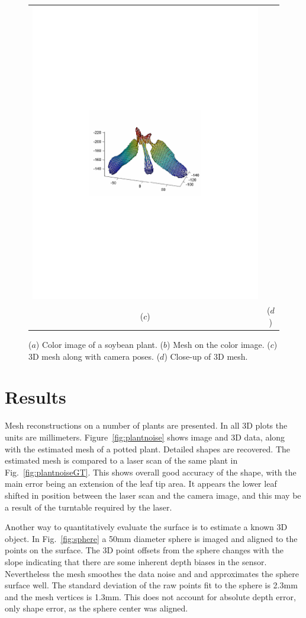 \begin{figure}
\begin{center}
\begin{tabular}{cc}
\includegraphics[trim=190 280 190 290,clip,width=0.48\linewidth]{Figures/soybean3DMesh} \\
($c$) & ($d$) \\
\end{tabular}
\end{center}
   \caption{($a$) Color image of a soybean plant.  ($b$) Mesh on the color image. ($c$) $3$D mesh along with camera poses. ($d$) Close-up of $3$D mesh.  }
\label{fig:soybean}
\end{figure}


\section{Results}
\label{sec:results}

Mesh reconstructions on a number of plants are presented.  In all 3D plots the units are millimeters.  Figure~\ref{fig:plantnoise} shows image and $3$D data, along with the estimated mesh of a potted plant.  Detailed shapes are recovered. The estimated mesh is compared to a laser scan of the same plant in Fig.~\ref{fig:plantnoiseGT}.  This shows overall good accuracy of the shape, with the main error being an extension of the leaf tip area.  It appears the lower leaf shifted in position between the laser scan and the camera image, and this may be a result of the turntable required by the laser.

Another way to quantitatively evaluate the surface is to estimate a known $3$D object.  In Fig.~\ref{fig:sphere} a 50mm diameter sphere is imaged and aligned to the points on the surface.  The $3$D point offsets from the sphere changes with the slope indicating that there are some inherent depth biases in the sensor.  Nevertheless the mesh smoothes the data noise and and approximates the sphere surface well.  The standard deviation of the raw points fit to the sphere is 2.3mm and the mesh vertices is 1.3mm.  This does not account for absolute depth error, only shape error, as the sphere center was aligned.

